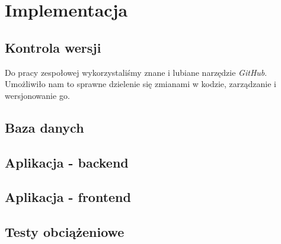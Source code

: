 \section{Implementacja}
\subsection{Kontrola wersji}
Do pracy zespołowej wykorzystaliśmy znane i lubiane narzędzie \textit{GitHub}. Umożliwiło nam to sprawne dzielenie się zmianami w kodzie, zarządzanie i wersjonowanie go.

\subsection{Baza danych}


\subsection{Aplikacja - backend}


\subsection{Aplikacja - frontend}


\subsection{Testy obciążeniowe}


